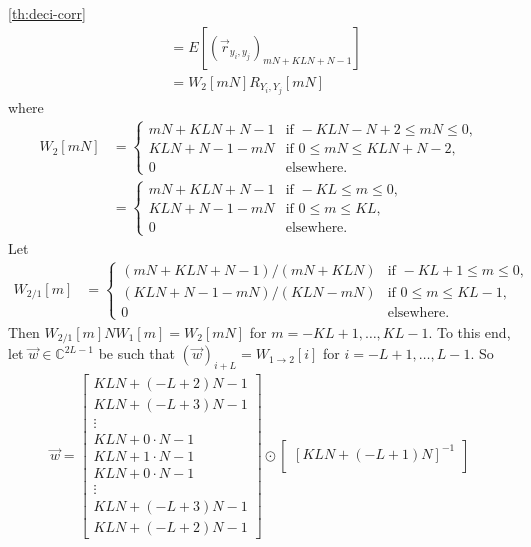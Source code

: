 \documentclass[a4paper, openany, oneside]{memoir}
\begin{document}
\begin{blockProofTheorem}{\ref{th:deci-corr}}
\begin{align*}
        &=E[(\vec{r}_{y_i,y_j})_{mN+KLN+N-1}] \\
        &= W_2[mN] R_{Y_i,Y_j}[mN]
    \end{align*}
    where
    \begin{align*}
        W_2[mN] &= \begin{cases}
            mN+KLN+N-1 & \text{if } -KLN-N+2 \le mN \le 0, \\
            KLN+N-1-mN& \text{if } 0 \le mN \le KLN+N-2, \\
            0 & \text{elsewhere.}
        \end{cases} \\
        &= \begin{cases}
            mN+KLN+N-1 & \text{if } -KL\le m \le 0, \\
            KLN+N-1-mN& \text{if } 0 \le m \le KL, \\
            0 & \text{elsewhere.}
        \end{cases}
    \end{align*}
    Let
    \begin{align*}
        W_{2/1}[m] &= \begin{cases}
            (mN+KLN+N-1)/(mN+KLN) & \text{if } -KL+1 \le m \le 0, \\
            (KLN+N-1-mN)/(KLN-mN) & \text{if } 0 \le m \le KL-1, \\
            0 & \text{elsewhere.}
        \end{cases}
    \end{align*}
    Then $W_{2/1}[m] N W_1[m] = W_2[mN]$ for $m = -KL+1,\ldots,KL-1$. To this end, let $\vec{w} \in \mathbb{C}^{2L-1}$ be such that $(\vec{w})_{i+L}=W_{1 \to 2}[i]$ for $i = -L+1,\ldots,L-1$. So
    \begin{align*}
        \vec{w} = \begin{bmatrix}
            KLN+(-L+2)N-1 \\
            KLN+(-L+3)N-1 \\
            \vdots \\
            KLN+0\cdot N-1 \\
            KLN+1\cdot N-1 \\
            KLN+0\cdot N-1 \\
            \vdots \\
            KLN+(-L+3)N-1 \\
            KLN+(-L+2)N-1
         \end{bmatrix} \odot \begin{bmatrix}
            [KLN+(-L+1)N]^{-1} \\

\end{bmatrix}
\end{align*}
\end{blockProofTheorem}
\end{document}
